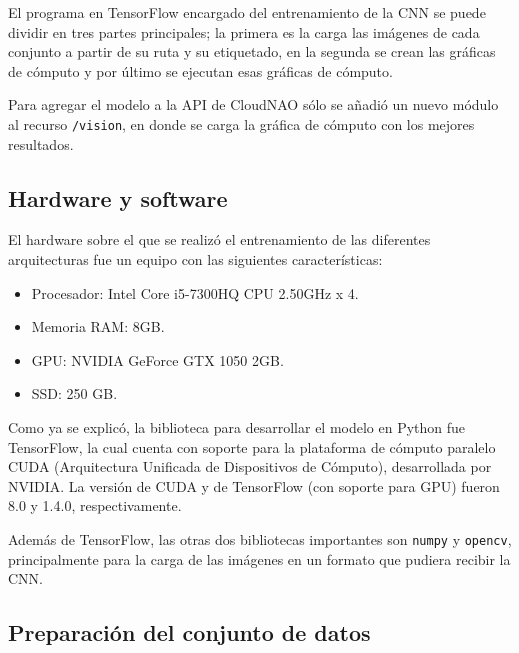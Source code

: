 El programa en TensorFlow encargado del entrenamiento de la CNN se puede dividir en tres partes principales; la primera es la carga las imágenes de cada conjunto a partir de su ruta y su etiquetado, en la segunda
se crean las gráficas de cómputo y por último se ejecutan esas gráficas de cómputo.

Para agregar el modelo a la API de CloudNAO sólo se añadió un nuevo módulo
al recurso \texttt{/vision}, en donde se carga la gráfica de cómputo 
con los mejores resultados.



\subsection{Hardware y software}

El hardware sobre el que se realizó el entrenamiento de las
diferentes arquitecturas fue un equipo con las siguientes características:

\begin{itemize}

\item Procesador: Intel Core i5-7300HQ CPU 2.50GHz x 4.
\item Memoria RAM: 8GB.
\item GPU:  NVIDIA GeForce GTX 1050 2GB.
\item SSD: 250 GB.
\end{itemize}

Como ya se explicó, la biblioteca para desarrollar el modelo en Python fue TensorFlow, la cual cuenta
con soporte para la plataforma de cómputo paralelo CUDA (Arquitectura
Unificada de Dispositivos de Cómputo), desarrollada por NVIDIA.
La versión de CUDA y de TensorFlow (con soporte para GPU) fueron 8.0 y 1.4.0, respectivamente.

Además de TensorFlow, las otras dos bibliotecas importantes son 
\texttt{numpy} y \texttt{opencv}, principalmente para la carga de
las imágenes en un formato que pudiera recibir la CNN.


\subsection{Preparación del conjunto de datos}


